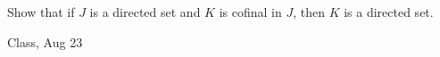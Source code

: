 \begin{samepage}
\begin{ex}
Show that if $J$ is a directed set and $K$ is cofinal in $J$, then $K$ is a directed set.
\end{ex}
\begin{source}
Class, Aug 23
\end{source}
\end{samepage}
